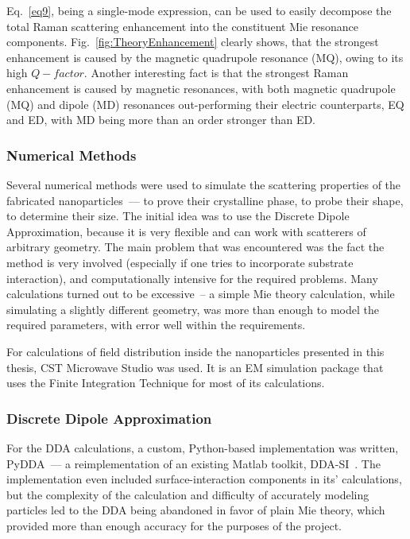         Eq.~\ref{eq9}, being a single-mode expression, can be used to easily decompose the total Raman scattering enhancement into the constituent
        Mie resonance components. Fig.~\ref{fig:TheoryEnhancement} clearly shows, that the strongest enhancement is caused by the magnetic quadrupole
        resonance (MQ), owing to its high $Q-factor$. Another interesting fact is that the strongest Raman enhancement is caused by magnetic resonances,
        with both magnetic quadrupole (MQ) and dipole (MD) resonances out-performing their electric counterparts, EQ and ED, with MD being more than an
        order stronger than ED.

    \subsubsection{Numerical Methods}
    \label{sec:Numeric}
        Several numerical methods were used to simulate the scattering properties of the fabricated nanoparticles~--- to prove their
        crystalline phase, to probe their shape, to determine their size. The initial idea was to use the Discrete Dipole Approximation,
        because it is very flexible and can work with scatterers of arbitrary geometry. The main problem that was encountered was the fact
        the method is very involved (especially if one tries to incorporate substrate interaction), and computationally intensive for
        the required problems. Many calculations turned out to be excessive~-- a simple Mie theory calculation,
        while simulating a slightly different geometry, was more than enough to model the required parameters, with error well within the
        requirements.

        For calculations of field distribution inside the nanoparticles presented in this thesis, CST Microwave Studio was used.
        It is an  EM simulation package that uses the Finite Integration Technique for most of its calculations.

        \clearpage
        \subsubsection{Discrete Dipole Approximation}
        \label{subsec:DDA}

                For the DDA calculations, a custom, Python-based implementation was written, PyDDA~--- a reimplementation of an existing
            Matlab toolkit, DDA-SI~\cite{loke2011discrete}. The implementation even included surface-interaction components in its' calculations,
            but the complexity of the calculation and difficulty of accurately modeling particles led to the DDA being abandoned in favor of plain
            Mie theory, which provided more than enough accuracy for the purposes of the project.

